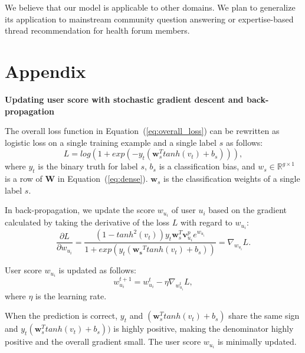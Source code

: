 \documentclass{bmcart}
\begin{document}
We believe that our model is applicable to other domains. We plan to generalize its application to mainstream community question answering or expertise-based thread recommendation for health forum members.


\newpage
\section*{Appendix}
{\bf Updating user score with stochastic gradient descent and back-propagation}

The overall loss function in Equation~(\ref{eq:overall_loss}) can be rewritten as logistic loss on a single training example and a single label $s$ as follows: 
\begin{equation}
    L = log(1+exp(-y_t(\boldsymbol{w}_{s}^T tanh(v_t)+b_s))), 
\end{equation}
where $y_t$ is the binary truth for label $s$, $b_s$ is a classification bias, and $w_s\in \mathbb{R}^{g\times1}$ is a row of $\boldsymbol{W}$ in Equation~(\ref{eq:dense}). $\boldsymbol{w}_{s}$ is the classification weights of a single label $s$.

In back-propagation, we update the score $w_{u_i}$ of user $u_i$ based on the gradient calculated by taking the derivative of the loss $L$ 
with regard to $w_{u_i}$:
\begin{equation}
    \frac{\partial L}{\partial w_{u_i}} = \frac{(1-tanh^2(v_t)){y_t}\boldsymbol{w}_{s}^T \boldsymbol{v}^{p}_{u_i}e^{w_{u_i}}}{1+exp(y_t(\boldsymbol{w_s}^T tanh(v_t)+b_s))}=\nabla_{w_{u_i}}L.
\end{equation}

User score $w_{u_i}$ is updated as follows: 
\begin{equation}
    w^{t+1}_{u_i} = w^{t}_{u_i} - \eta\nabla_{w^{t}_{u_i}}L,
\end{equation}
where $\eta$ is the learning rate.

When the prediction is correct, $y_t$ and $(\boldsymbol{w}_{s}^T tanh(v_t)+b_s)$ share the same sign and $y_t(\boldsymbol{w}_{s}^T tanh(v_t)+b_s))$ is highly positive, making the denominator highly positive and the overall gradient small. The user score $w_{u_i}$ is minimally updated.
\end{document}
